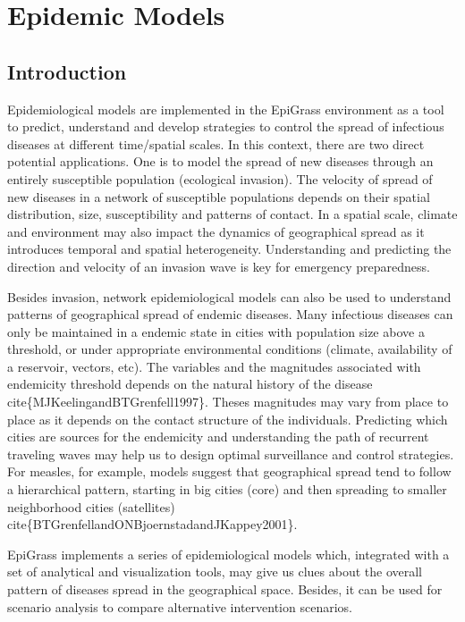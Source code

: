 \documentclass[a4paper,10pt,english]{sphinxmanual}
\begin{document}
\chapter{Epidemic Models}
\label{intromodels::doc}\label{intromodels:epidemic-models}

\section{Introduction}
\label{intromodels:index-0}\label{intromodels:introduction}
Epidemiological models are implemented in the EpiGrass environment as a tool to predict, understand and develop strategies to control the spread of infectious diseases at different time/spatial scales. In this context, there are two direct potential applications. One is to model the spread of new diseases through an entirely susceptible population (ecological invasion). The velocity of spread of new diseases in a network of susceptible populations depends on their spatial distribution, size, susceptibility and patterns of contact. In a spatial scale, climate and environment may also impact the dynamics of geographical spread as it introduces temporal and spatial heterogeneity. Understanding and predicting the direction and velocity of an invasion wave is key for emergency preparedness.

Besides invasion, network epidemiological models can also be used to understand patterns of geographical spread of endemic diseases. Many infectious diseases can only be maintained in a endemic state in cities with population size above a threshold, or under appropriate environmental conditions (climate, availability of a reservoir, vectors, etc). The variables and the magnitudes associated with endemicity threshold depends on the natural history of the disease cite\{MJKeelingandBTGrenfell1997\}. Theses magnitudes may vary from place to place as it depends on the contact structure of the individuals. Predicting which cities are sources for the endemicity and understanding the path of recurrent traveling waves may help us to design optimal surveillance and control strategies. For measles, for example, models suggest that geographical spread tend to follow a hierarchical pattern, starting in big cities (core) and then spreading to smaller neighborhood cities (satellites) cite\{BTGrenfellandONBjoernstadandJKappey2001\}.

EpiGrass implements a series of epidemiological models which, integrated with a set of analytical and visualization tools,  may give us clues about the overall pattern of diseases spread in the geographical space. Besides, it can be used for scenario analysis to compare alternative intervention scenarios.
\end{document}
